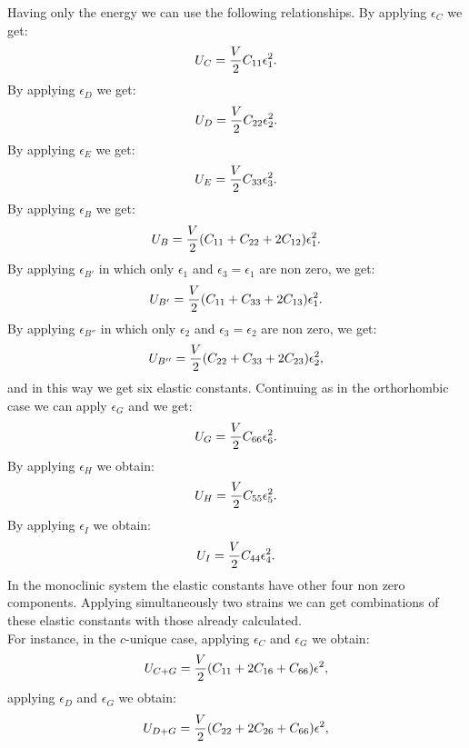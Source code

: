 \documentclass[12pt,a4paper,twoside]{report}
\begin{document}
Having only the energy we can use the following
relationships. By applying $\epsilon_C$ we get:
\begin{equation}
U_C= {V \over 2} C_{11} \epsilon_1^2.
\end{equation}
By applying $\epsilon_D$ we get:
\begin{equation}
U_D= {V \over 2} C_{22} \epsilon_2^2.
\end{equation}
By applying $\epsilon_E$ we get:
\begin{equation}
U_E= {V \over 2} C_{33} \epsilon_3^2.
\end{equation}
By applying $\epsilon_B$ we get:
\begin{equation}
U_B= {V \over 2} (C_{11} + C_{22} + 2 C_{12}) \epsilon_1^2.
\end{equation}
By applying $\epsilon_{B'}$ in which only $\epsilon_1$ and
$\epsilon_3=\epsilon_1$ are non zero, we get:
\begin{equation}
U_{B'}= {V \over 2} (C_{11} + C_{33} + 2 C_{13}) \epsilon_1^2.
\end{equation}
By applying $\epsilon_{B''}$ in which only $\epsilon_2$ and
$\epsilon_3=\epsilon_2$ are non zero, we get:
\begin{equation}
U_{B''}= {V \over 2} (C_{22} + C_{33} + 2 C_{23}) \epsilon_2^2,
\end{equation}
and in this way we get six elastic constants. Continuing as in the
orthorhombic case we can
apply $\epsilon_G$ and we get:
\begin{equation}
U_G= {V \over 2} C_{66} \epsilon_6^2.
\end{equation}
By applying $\epsilon_H$ we obtain:
\begin{equation}
U_H= {V \over 2} C_{55} \epsilon_5^2.
\end{equation}
By applying $\epsilon_I$ we obtain:
\begin{equation}
U_I= {V \over 2} C_{44} \epsilon_4^2.
\end{equation}
In the monoclinic system the elastic constants have other four non zero 
components.
Applying simultaneously two strains we can get combinations of these 
elastic constants with those already calculated. \\
For instance, in the $c$-unique case, applying $\epsilon_C$ and 
$\epsilon_G$ we obtain:
\begin{equation}
U_{C+G}= {V \over 2} (C_{11}+2 C_{16} + C_{66}) \epsilon^2,
\end{equation}
applying $\epsilon_D$ and $\epsilon_G$ we obtain:
\begin{equation}
U_{D+G}= {V \over 2} (C_{22}+2 C_{26} + C_{66}) \epsilon^2,
\end{equation}
\end{document}
